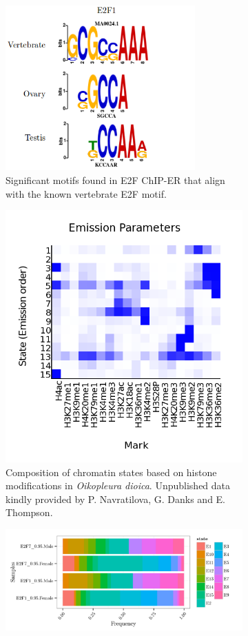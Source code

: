 \documentclass[11pt,twoside,a4paper]{report}
\begin{document}
		\begin{figure}
			\setlength{\belowcaptionskip}{5pt}
			\centering
			\begin{subfigure}[b]{0.5\textwidth}
				\includegraphics[width=0.8\textwidth]{pngs/E2F_motifs.png}
				\caption{Significant motifs found in E2F ChIP-ER that align with the known vertebrate E2F motif.}
			\end{subfigure}
			\begin{subfigure}[b]{1\textwidth}
				\centering
				\includegraphics[width=0.5\linewidth]{pngs/ChromHMM_emissions_15.png}
				\caption{
					Composition of chromatin states based on histone modifications in \textit{Oikopleura dioica}.
					{\footnotesize 	Unpublished data kindly provided by P. Navratilova, G. Danks and E. Thompson.}
				}
			\end{subfigure}
			\begin{subfigure}[b]{1\textwidth}
				\centering
				\includegraphics[width=1\linewidth]{pngs/E2F_chromatinAnnotation.png}

\end{subfigure}
\end{figure}
\end{document}
